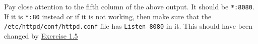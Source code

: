 Pay close attention to the fifth column of the above output. It should
be \texttt{*:8080}. If it is \texttt{*:80} instead or if it is not
working, then make sure that the \texttt{/etc/httpd/conf/httpd.conf}
file has \texttt{Listen\ 8080} in it. This should have been changed by
\href{../1.5-handlers}{Exercise 1.5}
